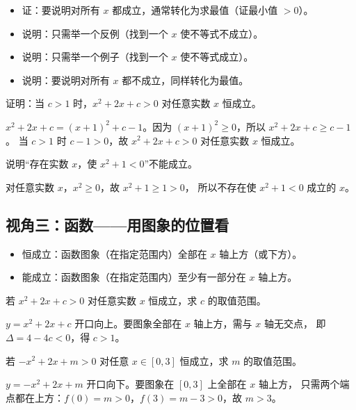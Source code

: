 \begin{explore}
\begin{itemize}
  \item 证：要说明对所有 $x$ 都成立，通常转化为求最值（证最小值 $>0$）。
  \item 说明：只需举一个反例（找到一个 $x$ 使不等式不成立）。
  \item 说明：只需举一个例子（找到一个 $x$ 使不等式成立）。
  \item 说明：要说明对所有 $x$ 都不成立，同样转化为最值。
\end{itemize}

\begin{example}
证明：当 $c>1$ 时，$x^2+2x+c>0$ 对任意实数 $x$ 恒成立。
\end{example}
\begin{solution}
$x^2+2x+c=(x+1)^2+c-1$。因为 $(x+1)^2\geq0$，所以 $x^2+2x+c\geq c-1$。
当 $c>1$ 时 $c-1>0$，故 $x^2+2x+c>0$ 对任意实数 $x$ 恒成立。
\end{solution}

\begin{problem}
说明“存在实数 $x$，使 $x^2+1<0$”不能成立。
\end{problem}
\begin{solution}
对任意实数 $x$，$x^2\geq0$，故 $x^2+1\geq1>0$，
所以不存在使 $x^2+1<0$ 成立的 $x$。
\end{solution}

\subsection{视角三：函数——用图象的位置看}

\begin{itemize}
  \item 恒成立：函数图象（在指定范围内）全部在 $x$ 轴上方（或下方）。
  \item 能成立：函数图象（在指定范围内）至少有一部分在 $x$ 轴上方。
\end{itemize}

\begin{example}
若 $x^2+2x+c>0$ 对任意实数 $x$ 恒成立，求 $c$ 的取值范围。
\end{example}
\begin{solution}
$y=x^2+2x+c$ 开口向上。要图象全部在 $x$ 轴上方，需与 $x$ 轴无交点，
即 $\Delta=4-4c<0$，得 $c>1$。
\end{solution}

\begin{problem}
若 $-x^2+2x+m>0$ 对任意 $x\in[0,3]$ 恒成立，求 $m$ 的取值范围。
\end{problem}
\begin{solution}
$y=-x^2+2x+m$ 开口向下。要图象在 $[0,3]$ 上全部在 $x$ 轴上方，
只需两个端点都在上方：$f(0)=m>0$，$f(3)=m-3>0$，故 $m>3$。
\end{solution}


\end{explore}
